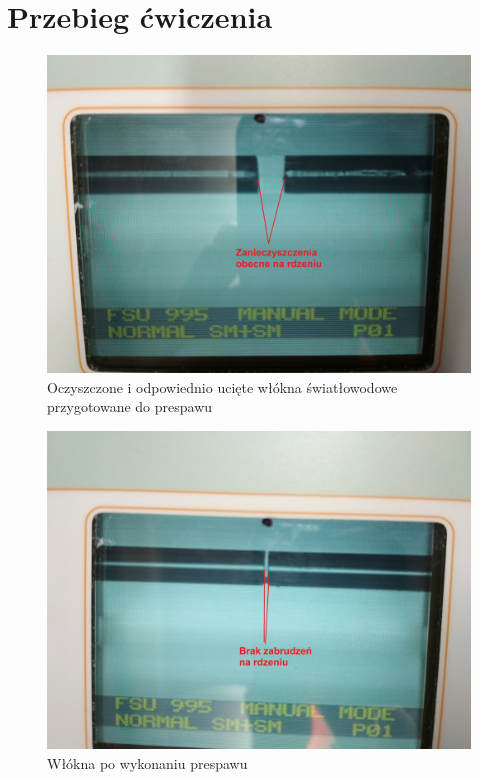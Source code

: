 \documentclass[12pt, a4paper, oneside]{article}
\begin{document}
\section{Przebieg ćwiczenia}
\begin{figure}[h]
\centering
\caption{Oczyszczone i odpowiednio ucięte włókna światłowodowe przygotowane do prespawu}
\includegraphics[scale=0.075]{f1.jpg}
\end{figure}\bigskip\bigskip\bigskip\bigskip\bigskip
\begin{figure}[h]
\centering
\caption{Włókna po wykonaniu prespawu}
\includegraphics[scale=0.075]{f2.jpg}
\end{figure}
\clearpage
\end{document}
